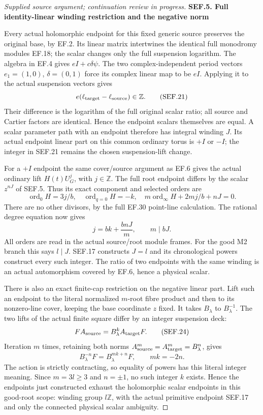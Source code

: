 \begin{proof}[Supplied source argument; continuation review in progress]
\par

\medskip\noindent\textbf{SEF.5. Full identity-linear winding restriction and the negative norm}

\par\nobreak

Every actual holomorphic endpoint for this fixed generic source
preserves the original base, by EF.2. Its linear matrix intertwines
the identical full monodromy modules EF.18; the scalar changes only
the full suspension logarithm. The algebra in EF.4 gives
\(eI+c\delta\psi\). The two complex-independent period vectors
\(e_1=(1,0)\), \(\delta=(0,1)\) force its complex linear map to be
\(eI\). Applying it to the actual suspension vectors gives
\[
                 e(\ell_{\rm target}-\ell_{\rm source})\in\mathbb Z .
 \tag{SEF.21}
\]
Their difference is the logarithm of the full original scalar ratio;
all source and Cartier factors are identical. Hence the endpoint
scalars themselves are equal. A scalar parameter path with an
endpoint therefore has integral winding \(J\). Its actual endpoint
linear part on this common ordinary torus is \(+I\) or \(-I\);
the integer in SEF.21 remains the chosen suspension-lift change.

For a \(+I\) endpoint the same cover/source argument as EF.6 gives
the actual ordinary lift \(H(t)U_G^j\), with \(j\in\mathbb Z\).
The full root endpoint differs by the scalar \(z^{nJ}\) of SEF.5.
Thus its exact component and selected orders are
\[
 \operatorname{ord}_0H=3j/b,\quad
 \operatorname{ord}_{q=0}H=-k,\quad
 m\operatorname{ord}_\infty H+2mj/b+nJ=0.
 \tag{SEF.22}
\]
There are no other divisors, by the full EF.30 point-line calculation.
The rational degree equation now gives
\[
                 j=bk+\frac{bnJ}{m},\qquad m\mid bJ .
 \tag{SEF.23}
\]
All orders are read in the actual source/root module frames.
For the good M2 branch this says \(l\mid J\).
SEF.17 constructs \(J=l\) and its chronological powers construct
every such integer. The ratio of two endpoints with the same winding
is an actual automorphism covered by EF.6, hence a physical scalar.

There is also an exact finite-cap restriction on the negative
linear part. Lift such an endpoint to the literal normalized
\(m\)-root fibre product and then to its nonzero-line cover, keeping
the base coordinate \(z\) fixed. It takes \(B_\lambda\) to
\(B_\lambda^{-1}\). The two lifts of the actual finite square differ
by an integer suspension deck:
\[
 F A_{\rm source}=B_\lambda^k A_{\rm target}F.
 \tag{SEF.24}
\]
Iteration \(m\) times, retaining both norms
\(A_{\rm source}^m=A_{\rm target}^m=B_\lambda^n\), gives
\[
 B_\lambda^{-n}F=B_\lambda^{mk+n}F,\qquad mk=-2n.
 \tag{SEF.25}
\]
The action is strictly contracting, so equality of powers has this
literal integer meaning. Since \(m=3l\ge3\) and \(n=\pm1\), no such
integer \(k\) exists. Hence the endpoints just constructed exhaust
the holomorphic scalar endpoints in this good-root scope: winding
group \(l\mathbb Z\), with the actual primitive endpoint SEF.17
and only the connected physical scalar ambiguity.


\end{proof}
